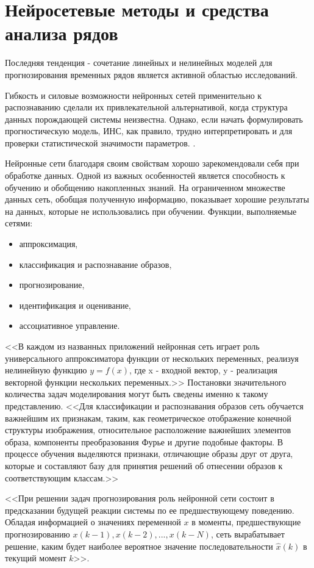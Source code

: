 \section{Нейросетевые методы и средства анализа рядов}
Последняя тенденция - сочетание линейных и нелинейных моделей для прогнозирования временных рядов является активной областью исследований. 

Гибкость и силовые возможности нейронных сетей  применительно к распознаванию сделали их привлекательной альтернативой, когда структура данных порождающей системы неизвестна. Однако, если начать формулировать прогностическую модель, ИНС, как правило, трудно интерпретировать и для проверки статистической значимости параметров. .

Нейронные сети благодаря своим свойствам хорошо зарекомендовали себя при обработке данных. Одной из важных особенностей является способность к обучению и обобщению накопленных знаний. На ограниченном множестве данных сеть, обобщая полученную информацию, показывает хорошие результаты на данных, которые не использовались при обучении.
Функции, выполняемые сетями:
\begin{itemize}
\item аппроксимация,
\item классификация и распознавание образов,
\item прогнозирование,
\item идентификация и оценивание,
\item ассоциативное управление.
\end{itemize}

<<В каждом из названных приложений нейронная сеть играет роль универсального аппроксиматора функции от нескольких переменных, реализуя нелинейную функцию $y=f(x)$, где x - входной вектор, y - реализация векторной функции нескольких переменных.>> Постановки значительного количества задач моделирования могут быть сведены именно к такому представлению.
<<Для классификации и распознавания образов сеть обучается важнейшим их признакам, таким, как геометрическое отображение конечной структуры изображения, относительное расположение важнейших элементов образа, компоненты преобразования Фурье и другие подобные факторы. В процессе обучения выделяются признаки, отличающие образы друг от друга, которые и составляют базу для принятия решений об отнесении образов к соответствующим классам.>> 

<<При решении задач прогнозирования роль нейронной сети состоит в предсказании будущей реакции системы по ее предшествующему поведению. Обладая информацией о значениях переменной $x$ в моменты, предшествующие прогнозированию $x(k-1), x(k-2), ..., x(k-N)$, сеть вырабатывает решение, каким будет наиболее вероятное значение последовательности $\widehat{x}(k)$ в текущий момент $k$>>.

